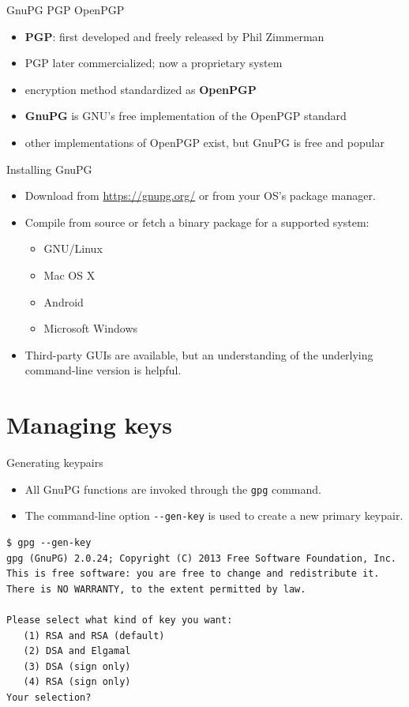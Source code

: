 \documentclass[
mode=present,
paper=smartboard,
size=20pt,
]{powerdot}
\newcommand{\clopt}[1]{\texttt{{-}#1}}
\begin{document}
\begin{slide}{GnuPG \vs PGP \vs OpenPGP}
  \begin{itemize}
  \item \textbf{PGP}: first developed and freely released by Phil Zimmerman
  \item PGP later commercialized; now a proprietary system
  \item encryption method standardized as \textbf{OpenPGP}
  \item \textbf{GnuPG} is GNU's free implementation of the OpenPGP standard
  \item other implementations of OpenPGP exist, but GnuPG is free and
    popular
  \end{itemize}
\end{slide}

\begin{slide}{Installing GnuPG}
  \begin{itemize}
  \item Download from \url{https://gnupg.org/} or from your OS's package manager.
  \item Compile from source or fetch a binary package for a supported
    system:
    \begin{itemize}
    \item GNU/Linux
    \item Mac OS X
    \item Android
    \item Microsoft Windows
    \end{itemize}
  \item Third-party GUIs are available, but an understanding of the underlying
    command-line version is helpful.
  \end{itemize}
\end{slide}

\section{Managing keys}

\begin{slide}[method=direct]{Generating keypairs}
  \begin{itemize}
  \item All GnuPG functions are invoked through the \texttt{gpg} command.
  \item The command-line option \clopt{-gen-key} is used to create a new
  primary keypair.
  \end{itemize}
\begin{verbatim}
$ gpg --gen-key
gpg (GnuPG) 2.0.24; Copyright (C) 2013 Free Software Foundation, Inc.
This is free software: you are free to change and redistribute it.
There is NO WARRANTY, to the extent permitted by law.

Please select what kind of key you want:
   (1) RSA and RSA (default)
   (2) DSA and Elgamal
   (3) DSA (sign only)
   (4) RSA (sign only)
Your selection?
\end{verbatim}
\end{slide}
\end{document}
